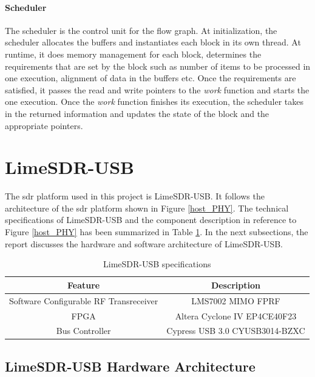 \paragraph{Scheduler}
The scheduler is the control unit for the flow graph.
At initialization, the scheduler allocates the buffers and instantiates each block in its own thread.
At runtime, it does memory management for each block, determines the requirements that are set by the block such as number of items to be processed in one execution, alignment of data in the buffers etc.
Once the requirements are satisfied, it passes the read and write pointers to the \textit{work} function and starts the one execution.
Once the \textit{work} function finishes its execution, the scheduler takes in the returned information and updates the state of the block and the appropriate pointers.\\


\section{LimeSDR-USB}
The \ac{sdr} platform used in this project is LimeSDR-USB.
It follows the architecture of the \ac{sdr} platform shown in Figure \ref{host_PHY}.
The technical specifications of LimeSDR-USB and the component description in reference to Figure \ref{host_PHY} has been summarized in Table \ref{specs}.
In the next subsections, the report discusses the hardware and software architecture of LimeSDR-USB.


\begin{table}[h!]
\centering
\begin{tabular}{|c|c|}
\hline
Feature & Description\\
\hline
Software Configurable RF Transreceiver & LMS7002 MIMO \ac{FPRF}\\
\ac{FPGA} & Altera Cyclone IV EP4CE40F23 \\
Bus Controller & Cypress USB 3.0 CYUSB3014-BZXC\\

\hline
\end{tabular}
\caption{LimeSDR-USB specifications}
\label{specs}
\end{table}

\subsection{LimeSDR-USB Hardware Architecture}

